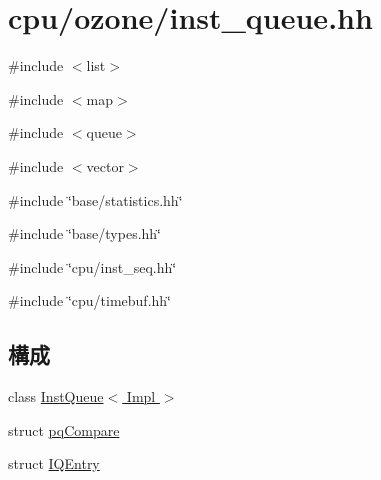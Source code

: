 \hypertarget{ozone_2inst__queue_8hh}{
\section{cpu/ozone/inst\_\-queue.hh}
\label{ozone_2inst__queue_8hh}
}
{\ttfamily \#include $<$list$>$}\par
{\ttfamily \#include $<$map$>$}\par
{\ttfamily \#include $<$queue$>$}\par
{\ttfamily \#include $<$vector$>$}\par
{\ttfamily \#include \char`\"{}base/statistics.hh\char`\"{}}\par
{\ttfamily \#include \char`\"{}base/types.hh\char`\"{}}\par
{\ttfamily \#include \char`\"{}cpu/inst\_\-seq.hh\char`\"{}}\par
{\ttfamily \#include \char`\"{}cpu/timebuf.hh\char`\"{}}\par
\subsection*{構成}
\begin{DoxyCompactItemize}
\item 
class \hyperlink{classInstQueue}{InstQueue$<$ Impl $>$}
\item 
struct \hyperlink{structInstQueue_1_1pqCompare}{pqCompare}
\item 
struct \hyperlink{structInstQueue_1_1IQEntry}{IQEntry}
\end{DoxyCompactItemize}
